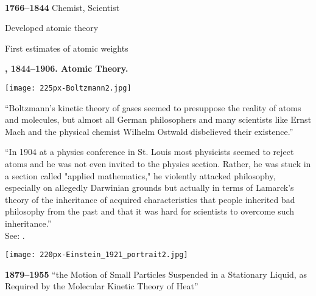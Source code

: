     
    \textbf{
        \\
        1766--1844
      }
        Chemist, Scientist
       
        Developed atomic theory
       
        First estimates of atomic weights
  

  \textbf{ , 1844--1906. Atomic Theory.}
      
\begin{marginfigure}[]
\texttt{[image: 225px-Boltzmann2.jpg]}\\
\end{marginfigure}

      
      \small
      ``Boltzmann's kinetic theory of gases seemed to presuppose the
      reality of atoms and molecules, but almost all German philosophers and
      many scientists like Ernst Mach and the physical chemist Wilhelm
      Ostwald disbelieved their existence.''
  
    \small
    ``In 1904 at a physics conference in St. Louis most
    physicists seemed to reject atoms and he was not even invited
    to the physics section.
    {
      Rather, he was stuck in a section
      called "applied mathematics,"} 
    {
      he violently attacked
      philosophy, especially on allegedly Darwinian grounds
      }
    {
      but
      actually in terms of Lamarck's theory of the inheritance of
      acquired characteristics that people inherited bad philosophy
      }
    {
      from the past and that it was hard for scientists to overcome
      such inheritance.''
    }
    \\
    {\mbox{} \hfill
      See: .}
    
    
\begin{marginfigure}[]
\texttt{[image: 220px-Einstein\_1921\_portrait2.jpg]}\\
\end{marginfigure}

    
    \textbf{
    1879--1955}
       ``the Motion of Small Particles Suspended in a Stationary Liquid, as Required by the Molecular Kinetic Theory of Heat''\cite{einstein1905a,einstein1956a}
     
